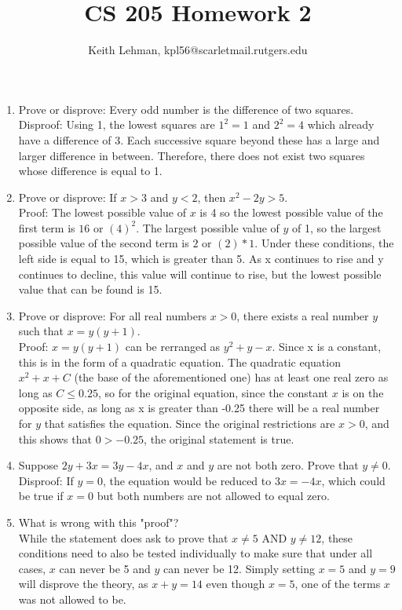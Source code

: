 \documentclass{article}
\title{CS 205 Homework 2}
\author{Keith Lehman, kpl56@scarletmail.rutgers.edu}
\begin{document}
\maketitle

\begin{enumerate}
\item Prove or disprove: Every odd number is the difference of two squares. \\
    Disproof: Using 1, the lowest squares are $1^2=1$ and $2^2=4$ which already have a difference of 3. Each successive square beyond these has a large and larger difference in between. Therefore, there does not exist two squares whose difference is equal to 1.
\item Prove or disprove: If $x > 3$ and $y < 2$, then $x^2 - 2y > 5$. \\
    Proof: The lowest possible value of $x$ is 4 so the lowest possible value of the first term is $16$ or $(4)^2$. The largest possible value of $y$ of 1, so the largest possible value of the second term is $2$ or $(2)*1$. Under these conditions, the left side is equal to 15, which is greater than 5. As x continues to rise and y continues to decline, this value will continue to rise, but the lowest possible value that can be found is 15.
\item Prove or disprove: For all real numbers $x>0$, there exists a real number $y$ such that $x=y(y+1)$. \\
    Proof: $x=y(y+1)$ can be rerranged as $y^2+y-x$. Since x is a constant, this is in the form of a quadratic equation. The quadratic equation $x^2+x+C$ (the base of the aforementioned one) has at least one real zero as long as $C \leq 0.25$, so for the original equation, since the constant $x$ is on the opposite side, as long as x is greater than -0.25 there will be a real number for $y$ that satisfies the equation. Since the original restrictions are $x > 0$, and this shows that $0 > -0.25$, the original statement is true.  
\item Suppose $2y+3x=3y-4x$, and $x$ and $y$ are not both zero. Prove that $y \neq 0$. \\
    Disproof: If $y=0$, the equation would be reduced to $3x=-4x$, which could be true if $x=0$ but both numbers are not allowed to equal zero. \Lightning
\item What is wrong with this "proof"? \\
    While the statement does ask to prove that $x \neq 5$ AND $y \neq 12$, these conditions need to also be tested individually to make sure that under all cases, $x$ can never be 5 and $y$ can never be 12. Simply setting $x=5$ and $y=9$ will disprove the theory, as $x+y=14$ even though $x=5$, one of the terms $x$ was not allowed to be.  

\end{enumerate}
\end{document}
